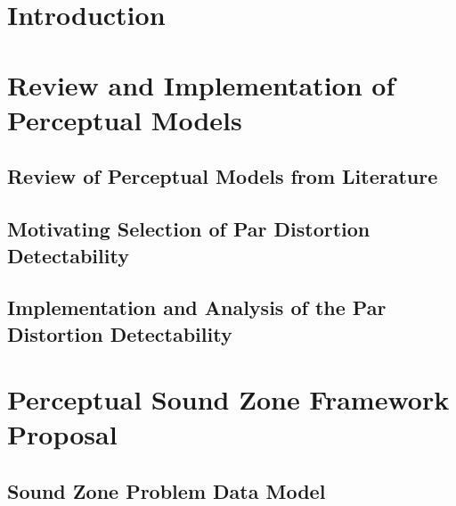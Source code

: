 \documentclass[10pt,twoside,openright,titlepage]{ce}
\begin{document}
\frontmatter
\makecover
\maketitle
\makesignature


\tableofcontents
\mainmatter

\chapter{Introduction}
\label{ch:introduction}

\newpage


\chapter{Review and Implementation of Perceptual Models}
\label{ch:perceptual}

\newpage
\section{Review of Perceptual Models from Literature}
\label{ch:perceptual:review}

\newpage
\section{Motivating Selection of Par Distortion Detectability}
\label{ch:perceptual:selection}

\newpage
\section{Implementation and Analysis of the Par Distortion Detectability}
\label{ch:perceptual:implementation}

\newpage

\chapter{Perceptual Sound Zone Framework Proposal}
\label{ch:sound_zone}

\newpage
\section{Sound Zone Problem Data Model}
\label{ch:sound_zone:data_model}

\newpage
\end{document}
